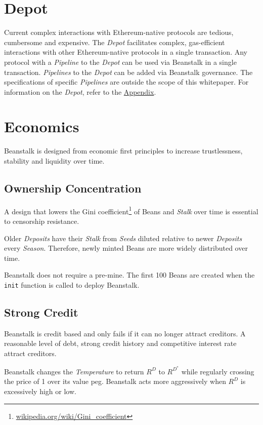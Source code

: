 \documentclass[tikz]{article}
\newcommand{\code}[1]{\texttt{#1}}
\newcommand{\term}[1]{\textsl{#1}}
\newcommand{\fref}[1]{\footnote{\href{http://#1}{#1}}}
\newcommand{\Bean}{} %
\begin{document}
\section{Depot}
Current complex interactions with Ethereum-native protocols are tedious, cumbersome and expensive. The \term{Depot} facilitates complex, gas-efficient interactions with other Ethereum-native protocols in a single transaction. Any protocol with a \term{Pipeline} to the \term{Depot} can be used via Beanstalk in a single transaction. \term{Pipelines} to the \term{Depot} can be added via Beanstalk governance. The specifications of specific \term{Pipelines} are outside the scope of this whitepaper. For information on the \term{Depot}, refer to the \hyperlink{section.14}{Appendix}.

\section{Economics}
Beanstalk is designed from economic first principles to increase trustlessness, stability and liquidity over time.

\subsection{Ownership Concentration}
A design that lowers the Gini coefficient\fref{wikipedia.org/wiki/Gini\_coefficient} of Beans and \term{Stalk} over time is essential to censorship resistance.

Older \term{Deposits} have their \term{Stalk} from \term{Seeds} diluted relative to newer \term{Deposits} every \term{Season}. Therefore, newly minted Beans are more widely distributed over time.

Beanstalk does not require a pre-mine. The first 100 Beans are created when the \code{init} function is called to deploy Beanstalk.

\subsection{Strong Credit}
Beanstalk is credit based and only fails if it can no longer attract creditors. A reasonable level of debt, strong credit history and competitive interest rate attract creditors. 

Beanstalk changes the \term{Temperature} to return $R^D$ to $R^{D^*}$ while regularly crossing the price of \Bean1 over its value peg. Beanstalk acts more aggressively when $R^D$ is excessively high or low.
\end{document}
